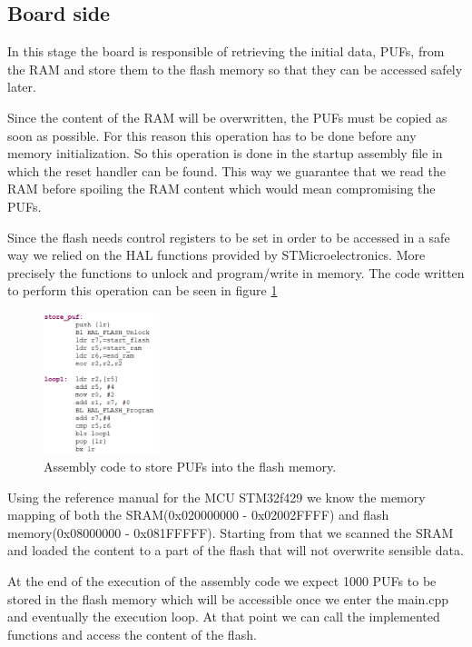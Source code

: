\subsection{Board side}

In this stage the board is responsible of retrieving the initial data, PUFs, from the RAM and store them to the flash memory so that they can be accessed safely later.

Since the content of the RAM will be overwritten, the PUFs must be copied as soon as possible. For this reason this operation has to be done before any memory initialization. So this operation is done in the startup assembly file in which the reset handler can be found. This way we guarantee that we read the RAM before spoiling the RAM content which would mean compromising the PUFs.

Since the flash needs control registers to be set in order to be accessed in a safe way we relied on the HAL functions provided by STMicroelectronics. More precisely the functions to unlock and program/write in memory. The code written to perform this operation can be seen in figure \ref{fig:code_assembly}

\begin{figure}[h!]
	\centering
	\vspace{0.5cm}
	\includegraphics[width = 0.3\textwidth]{images/code_assembly.png}
	\caption{Assembly code to store PUFs into the flash memory. }
	\label{fig:code_assembly}
\end{figure}

Using the reference manual for the MCU STM32f429 we know the memory mapping of both the SRAM(0x020000000 -  0x02002FFFF) and flash memory(0x08000000 - 0x081FFFFF). Starting from that we scanned the SRAM and loaded the content to a part of the flash that will not overwrite sensible data.

At the end of the execution of the assembly code we expect 1000 PUFs to be stored in the flash memory which will be accessible once we enter the main.cpp and eventually the execution loop. At that point we can call the implemented functions and access the content of the flash.

